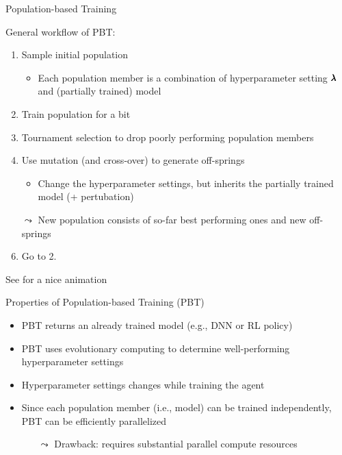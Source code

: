 \documentclass[aspectratio=169]{../latex_main/tntbeamer}  %
\begin{document}
\begin{frame}[c]{Population-based Training  }

General workflow of PBT:

\begin{enumerate}
	\item Sample initial population
	\begin{itemize}
		\item Each population member is a combination of hyperparameter setting $\pmb{\lambda}$ and (partially trained) model
	\end{itemize}
	\pause
	\item Train population for a bit 
	\pause
	\item Tournament selection to drop poorly performing population members
	\pause
	\item Use mutation (and cross-over) to generate off-springs
	\begin{itemize}
		\item Change the hyperparameter settings, but inherits the partially trained model (+ pertubation)
	\end{itemize}
	\pause
	\item[$\leadsto$] New population consists of so-far best performing ones and new off-springs
	\pause
	\item Go to 2.
\end{enumerate}

\pause
See  for a nice animation

\end{frame}
\begin{frame}[c]{Properties of Population-based Training (PBT)}

\begin{itemize}
	\item PBT returns an already trained model (e.g., DNN or RL policy)
	\bigskip
	\pause
	\item PBT uses evolutionary computing to determine well-performing hyperparameter settings
	\bigskip
	\pause
	\item Hyperparameter settings changes while training the agent
	\bigskip
	\pause
	\item Since each population member (i.e., model) can be trained independently,\\ PBT can be efficiently parallelized
	\begin{itemize}
		\item[$\leadsto$] Drawback: requires substantial parallel compute resources
	\end{itemize}
\end{itemize}

\end{frame}
\end{document}
